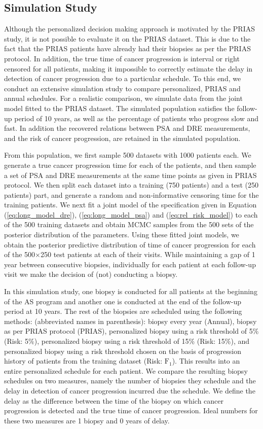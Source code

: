 \subsection{Simulation Study}
Although the personalized decision making approach is motivated by the PRIAS study, it is not possible to evaluate it on the PRIAS dataset. This is due to the fact that the PRIAS patients have already had their biopsies as per the PRIAS protocol. In addition, the true time of cancer progression is interval or right censored for all patients, making it impossible to correctly estimate the delay in detection of cancer progression due to a particular schedule. To this end, we conduct an extensive simulation study to compare personalized, PRIAS and annual schedules. For a realistic comparison, we simulate data from the joint model fitted to the PRIAS dataset. The simulated population satisfies the follow-up period of 10 years, as well as the percentage of patients who progress slow and fast. In addition the recovered relations between PSA and DRE measurements, and the risk of cancer progression, are retained in the simulated population.

From this population, we first sample 500 datasets with 1000 patients each. We generate a true cancer progression time for each of the patients, and then sample a set of PSA and DRE measurements at the same time points as given in PRIAS protocol. We then split each dataset into a training (750 patients) and a test (250 patients) part, and generate a random and non‐informative censoring time for the training patients. We next fit a joint model of the specification given in Equation (\ref{eq:long_model_dre}), (\ref{eq:long_model_psa}) and (\ref{eq:rel_risk_model}) to each of the 500 training datasets and obtain MCMC samples from the 500 sets of the posterior distribution of the parameters. Using these fitted joint models, we obtain the posterior predictive distribution of time of cancer progression for each of the 500$\times$250 test patients at each of their visits. While maintaining a gap of 1 year between consecutive biopsies, individually for each patient at each follow-up visit we make the decision of (not) conducting a biopsy. 

In this simulation study, one biopsy is conducted for all patients at the beginning of the AS program and another one is conducted at the end of the follow-up period at 10 years. The rest of the biopsies are scheduled using the following methods: (abbreviated names in parenthesis): biopsy every year (Annual), biopsy as per PRIAS protocol (PRIAS), personalized biopsy using a risk threshold of 5\% (Risk: 5\%), personalized biopsy using a risk threshold of 15\% (Risk: 15\%), and personalized biopsy using a risk threshold chosen on the basis of progression history of patients from the training dataset (Risk: $\mbox{F}_1$). This results into an entire personalized schedule for each patient. We compare the resulting biopsy schedules on two measures, namely the number of biopsies they schedule and the delay in detection of cancer progression incurred due the schedule. We define the delay as the difference between the time of the biopsy on which cancer progression is detected and the true time of cancer progression. Ideal numbers for these two measures are 1 biopsy and 0 years of delay.